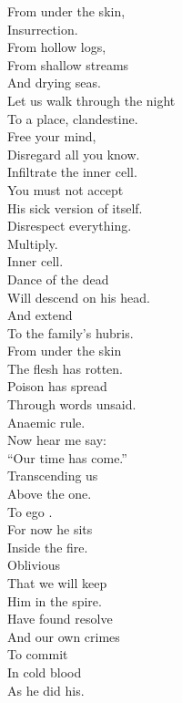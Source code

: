 From under the skin, \\
Insurrection. \\
From hollow logs, \\
From shallow streams \\
And drying seas. \\

Let us walk through the night \\
To a place, clandestine. \\
Free your mind, \\
Disregard all you know. \\
Infiltrate the inner cell. \\

You must not accept \\
His sick version of  itself. \\
Disrespect everything. \\
Multiply. \\
Inner cell. \\

Dance of the dead \\
Will descend on his head. \\
And extend \\
To the family's hubris. \\

From under the skin \\
The flesh has rotten. \\
Poison has spread \\
Through words unsaid. \\
Anaemic rule. \\

Now hear me say: \\
``Our time has come.'' \\
Transcending us \\
Above the one. \\
To ego . \\

For now he sits \\
Inside the fire. \\
Oblivious \\
That we will keep \\
Him in the spire. \\

Have found resolve \\
And our own crimes \\
To commit \\
In cold blood \\
As he did his. \\

